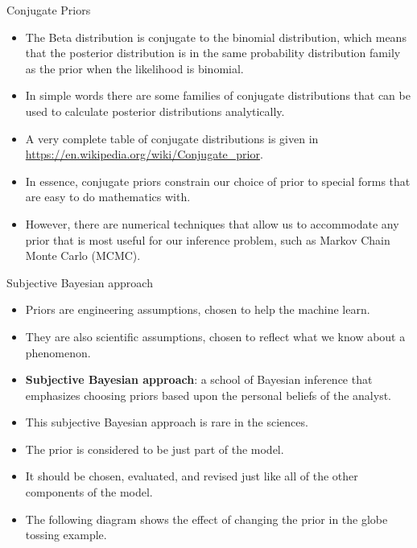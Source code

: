 \documentclass[handout]{beamer}
\begin{document}
\begin{frame}{Conjugate Priors}
\scriptsize{

\begin{itemize}
\item The Beta distribution is conjugate to the binomial distribution, which means that the posterior distribution is in the same probability distribution family as the prior when the likelihood is binomial.

\item In simple words there are some families of conjugate distributions that can be used to calculate posterior distributions analytically.

\item A very complete table of conjugate distributions is given in \url{https://en.wikipedia.org/wiki/Conjugate_prior}.

\item In essence, conjugate priors constrain our choice of prior to special forms that are easy to do mathematics with.

\item However, there are numerical techniques that allow us to accommodate any prior that is most useful for our inference problem, such as Markov Chain Monte Carlo (MCMC).

\end{itemize}

} 

\end{frame}





\begin{frame}{Subjective Bayesian approach}
\scriptsize{

\begin{itemize}
\item Priors are engineering assumptions, chosen to help the machine learn.
\item They are also  scientific assumptions, chosen to reflect what we know about a phenomenon.
\item \textbf{Subjective Bayesian approach}:  a school of Bayesian inference that emphasizes choosing priors based upon the personal beliefs of the analyst. 
\item This subjective Bayesian approach is rare in the sciences.
\item The prior is considered to be just part of the model.
\item It should be chosen, evaluated, and revised just like all of the other components of the model.
\item The following diagram shows the effect of changing the prior in the globe tossing example.




\end{itemize}

} 

\end{frame}
\end{document}
